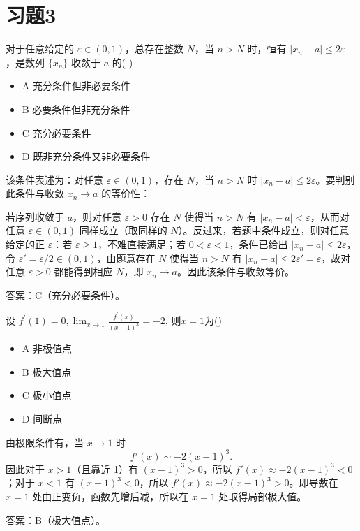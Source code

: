 \chapter{习题3}
\clearpage

\begin{question}{}{}
    对于任意给定的 $\varepsilon\in(0,1)$，总存在整数 $N$，当 $n>N$ 时，恒有 $|x_n-a|\le 2\varepsilon$ ，是数列 $\{x_n\}$ 收敛于 $a$ 的( )

    \begin{multicols}{2}  %
        \begin{itemize}[label={}]
            \item A 充分条件但非必要条件
            \item B 必要条件但非充分条件
            \item C 充分必要条件
            \item D 既非充分条件又非必要条件
        \end{itemize}
    \end{multicols}
\end{question}
\begin{solution}
    该条件表述为：对任意 $\varepsilon\in(0,1)$，存在 $N$，当 $n>N$ 时 $|x_n-a|\le2\varepsilon$。要判别此条件与收敛 $x_n\to a$ 的等价性：

    若序列收敛于 $a$，则对任意 $\varepsilon>0$ 存在 $N$ 使得当 $n>N$ 有 $|x_n-a|<\varepsilon$，从而对任意 $\varepsilon\in(0,1)$ 同样成立（取同样的 $N$）。反过来，若题中条件成立，则对任意给定的正 $\varepsilon$：若 $\varepsilon\ge1$，不难直接满足；若 $0<\varepsilon<1$，条件已给出 $|x_n-a|\le2\varepsilon$，令 $\varepsilon'=\varepsilon/2\in(0,1)$，由题意存在 $N$ 使得当 $n>N$ 有 $|x_n-a|\le2\varepsilon'=\varepsilon$，故对任意 $\varepsilon>0$ 都能得到相应 $N$，即 $x_n\to a$。因此该条件与收敛等价。

    答案：C（充分必要条件）。
\end{solution}

\begin{question}{}{}
    设 $f^\prime(1)=0,\lim_{x\to1}\frac{f^{\prime}(x)}{\left(x-1\right)^3}=-2$, 则$x=1$为()
    \begin{multicols}{4}  %
        \begin{itemize}[label={}]
            \item A 非极值点
            \item B 极大值点
            \item C 极小值点
            \item D 间断点
        \end{itemize}
    \end{multicols}
\end{question}
\begin{solution}
    由极限条件有，当 $x\to1$ 时
    \[
        f'(x)\sim -2(x-1)^3.
    \]
    因此对于 $x>1$（且靠近 1）有 $(x-1)^3>0$，所以 $f'(x)\approx -2(x-1)^3<0$；对于 $x<1$ 有 $(x-1)^3<0$，所以 $f'(x)\approx -2(x-1)^3>0$。即导数在 $x=1$ 处由正变负，函数先增后减，所以在 $x=1$ 处取得局部极大值。

    答案：B（极大值点）。
\end{solution}

